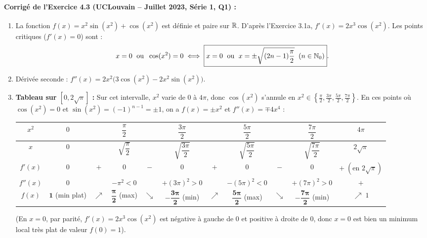 \paragraph{Corrigé de l'Exercice 4.3 (UCLouvain -- Juillet 2023, Série 1, Q1) :}
\begin{enumerate}[label=(\alph*)]
    \item La fonction $f(x) = x^2\sin(x^2)+\cos(x^2)$ est définie et paire sur $\mathbb{R}$. D'après l'Exercice 3.1a, $\boxed{f'(x) = 2x^3\cos(x^2)}$. Les points critiques ($f'(x) = 0$) sont :
    \[
        x = 0 \;\text{ ou }\; \cos(x^2) = 0 \iff \boxed{x = 0 \;\text{ ou }\; x = \pm\sqrt{(2n-1)\frac{\pi}{2}} \;\;(n \in \mathbb{N}_0)}.
    \]
    \item Dérivée seconde : $\boxed{f''(x) = 2x^2\bigl(3\cos(x^2) - 2x^2\sin(x^2)\bigr)}$.
    \item \textbf{Tableau sur $[0, 2\sqrt{\pi}]$ :} Sur cet intervalle, $x^2$ varie de $0$ à $4\pi$, donc $\cos(x^2)$ s'annule en $x^2 \in \left\{\frac{\pi}{2}, \frac{3\pi}{2}, \frac{5\pi}{2}, \frac{7\pi}{2}\right\}$. En ces points où $\cos(x^2) = 0$ et $\sin(x^2) = (-1)^{n-1} = \pm 1$, on a $f(x) = \pm x^2$ et $f''(x) = \mp 4x^4$ :
    \begin{center}
    {\footnotesize
    \renewcommand{\arraystretch}{1.4}
    \setlength{\tabcolsep}{2.8pt}
    \begin{tabular}{|c||c|c|c|c|c|c|c|c|c|c|}
    \hline
    $x^2$ & $0$ & & $\dfrac{\pi}{2}$ & & $\dfrac{3\pi}{2}$ & & $\dfrac{5\pi}{2}$ & & $\dfrac{7\pi}{2}$ & $4\pi$ \\ \hline
    $x$ & $0$ & & $\sqrt{\dfrac{\pi}{2}}$ & & $\sqrt{\dfrac{3\pi}{2}}$ & & $\sqrt{\dfrac{5\pi}{2}}$ & & $\sqrt{\dfrac{7\pi}{2}}$ & $2\sqrt{\pi}$ \\ \hline\hline
    $f'(x)$ & $0$ & $+$ & $0$ & $-$ & $0$ & $+$ & $0$ & $-$ & $0$ & $+\;(\text{en } 2\sqrt{\pi})$ \\ \hline
    $f''(x)$ & $0$ & & $-\pi^2 < 0$ & & $+(3\pi)^2 > 0$ & & $-(5\pi)^2 < 0$ & & $+(7\pi)^2 > 0$ & $+$ \\ \hline
    $f(x)$ & $\mathbf{1}$ (min plat) & $\nearrow$ & $\mathbf{\dfrac{\pi}{2}}$ (max) & $\searrow$ & $\mathbf{-\dfrac{3\pi}{2}}$ (min) & $\nearrow$ & $\mathbf{\dfrac{5\pi}{2}}$ (max) & $\searrow$ & $\mathbf{-\dfrac{7\pi}{2}}$ (min) & $\nearrow\; 1$ \\ \hline
    \end{tabular}
    }
    \end{center}
    (En $x = 0$, par parité, $f'(x) = 2x^3\cos(x^2)$ est négative à gauche de $0$ et positive à droite de $0$, donc $x = 0$ est bien un minimum local très plat de valeur $f(0) = 1$).
\end{enumerate}

